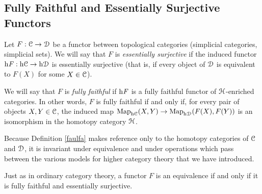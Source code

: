 \subsection{Fully Faithful and Essentially Surjective Functors}
\begin{1.2.10 F. faithful; E. surj functors}
\begin{definition}\label{faulfa}
Let $F: \operatorname{\mathcal{C}} \rightarrow \operatorname{\mathcal{D}}$ be a functor between topological categories (simplicial categories, simplicial sets). We will say that $F$ is {\it essentially surjective} if the induced functor 
$\rm{h} \it{F}: \rm{h} \it{\operatorname{\mathcal{C}}} \rightarrow \rm{h} \it{\operatorname{\mathcal{D}}}$ is essentially surjective (that is, if every object of $\operatorname{\mathcal{D}}$ is
equivalent to $F(X)$ for some $X \in \operatorname{\mathcal{C}}$). 

We will say that $F$ is {\it fully faithful} if $\rm{h} \it{F}$ is a fully faithful functor of $\operatorname{\mathcal{H}}$-enriched categories. In other words, $F$ is fully faithful if and only if, for every pair of objects
$X, Y \in \operatorname{\mathcal{C}}$, the induced map
$\operatorname{{Map}}_{\rm{h} \it{\operatorname{\mathcal{C}}}}(X,Y) \rightarrow \operatorname{{Map}}_{\rm{h} \it{\operatorname{\mathcal{D}}}}(F(X),F(Y))$ is an isomorphism in the homotopy category $\operatorname{\mathcal{H}}$. 
\end{definition}

\begin{remark}
Because Definition \ref{faulfa} makes reference only to the homotopy categories of $\operatorname{\mathcal{C}}$ and $\operatorname{\mathcal{D}}$, it is invariant under equivalence and under operations which pass between
the various models for higher category theory that we have introduced.
\end{remark}

Just as in ordinary category theory, a functor $F$ is an equivalence if and only if it is fully faithful and essentially surjective.
\end{1.2.10 F. faithful; E. surj functors}
